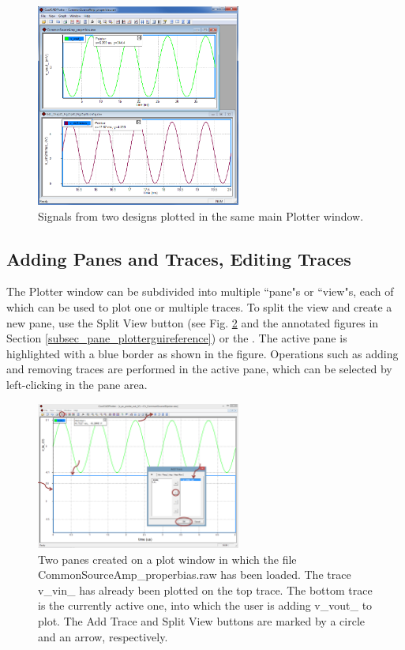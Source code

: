 \begin{figure}
    \includegraphics[width=0.6\textwidth]{./figures/plotter_netlist_editor_figures/Plotter_MultipleSubwindows.png}
    \caption{{Signals from two designs plotted in the same main Plotter window.}}
  \label{fig_plotter_multiplesubwindows}
\end{figure}

\subsection{Adding Panes and Traces, Editing Traces}
\label{subsec_pane_addingtraces}

The Plotter window can be subdivided into multiple ``pane"s or ``view"s, each of which can be used to plot one or multiple traces.  To split the view and create a new pane, use the \textsf{Split View} button (see Fig. \ref{fig_plotter_multipaneaddtrace} and the annotated figures in Section \ref{subsec_pane_plotterguireference}) or the . The active pane is highlighted with a blue border as shown in the figure.  Operations such as adding and removing traces are performed in the active pane, which can be selected by left-clicking in the pane area.   

\begin{figure}
    \includegraphics[width=0.6\textwidth]{./figures/plotter_netlist_editor_figures/Plotter_AddingTraces_MultiPane.png}
    \caption{{Two panes created on a plot window in which the file \textsf{CommonSourceAmp\_properbias.raw} has been loaded.  The trace \textsf{v\_vin\_} has already been plotted on the top trace.  The bottom trace is the currently active one, into which the user is adding \textsf{v\_vout\_} to plot.  The Add Trace and Split View buttons are marked by a circle and an arrow, respectively.}}
  \label{fig_plotter_multipaneaddtrace}
\end{figure}

